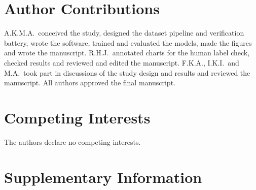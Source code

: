 \documentclass[11pt,a4paper]{article}
\begin{document}
\section*{Author Contributions}
A.K.M.A.\ conceived the study, designed the dataset pipeline and verification battery,
wrote the software, trained and evaluated the models, made the figures and wrote the
manuscript. R.H.J.\ annotated charts for the human label check, checked results and reviewed
and edited the manuscript. F.K.A., I.K.I.\ and M.A.\ took part in discussions of the study design and results and reviewed the manuscript. All authors
approved the final manuscript.

\section*{Competing Interests}
The authors declare no competing interests.

\clearpage
\section*{Supplementary Information}




\end{document}
